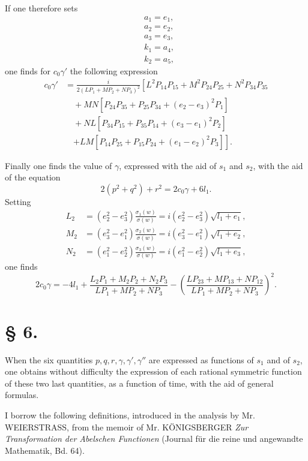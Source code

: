 \documentclass{article}
\begin{document}
If one therefore sets
\begin{align*}
&a_1 = e_1, \\
&a_2 = e_2, \\
&a_3 = e_3, \\
&k_1 = a_4, \\
&k_2 = a_5,
\end{align*}
one finds for $c_0\gamma'$ the following expression
\begin{align*}
c_0\gamma' &= \frac{i}{2(LP_1 + MP_2 + NP_3)^2}\left[L^2P_{14}P_{15} + M^2P_{24}P_{25} + N^2P_{34}P_{35}\right. \\
&\quad + MN[P_{24}P_{35} + P_{25}P_{34} + (e_2 - e_3)^2P_1] \\
&\quad + NL[P_{34}P_{15} + P_{35}P_{14} + (e_3 - e_1)^2P_2] \\
&\quad \left. + LM[P_{14}P_{25} + P_{15}P_{24} + (e_1 - e_2)^2P_3]\right].
\end{align*}

Finally one finds the value of $\gamma$, expressed with the aid of $s_1$ and $s_2$, with the aid of the equation
\[
2(p^2 + q^2) + r^2 = 2c_0\gamma + 6l_1.
\]
Setting
\begin{align*}
L_2 &= (e_2^2 - e_3^2)\frac{\sigma_1(w)}{\sigma(w)} = i(e_2^2 - e_3^2)\sqrt{l_1 + e_1}, \\
M_2 &= (e_3^2 - e_1^2)\frac{\sigma_2(w)}{\sigma(w)} = i(e_3^2 - e_1^2)\sqrt{l_1 + e_2}, \\
N_2 &= (e_1^2 - e_2^2)\frac{\sigma_3(w)}{\sigma(w)} = i(e_1^2 - e_2^2)\sqrt{l_1 + e_3},
\end{align*}
one finds
\[
2c_0\gamma = -4l_1 + \frac{L_2P_1 + M_2P_2 + N_2P_3}{LP_1 + MP_2 + NP_3} - \left(\frac{LP_23 + MP_13 + NP_12}{LP_1 + MP_2 + NP_3}\right)^2.
\]


\section*{§ 6.}
\setcounter{equation}{0}

When the six quantities $p, q, r, \gamma, \gamma', \gamma''$ are expressed as functions of $s_1$ and of $s_2$, one obtains without difficulty the expression of each rational symmetric function of these two last quantities, as a function of time, with the aid of general formulas.

I borrow the following definitions, introduced in the analysis by Mr. WEIERSTRASS, from the memoir of Mr. KÖNIGSBERGER \textit{Zur Transformation der Abelschen Functionen} (Journal für die reine und angewandte Mathematik, Bd. 64).
\end{document}
